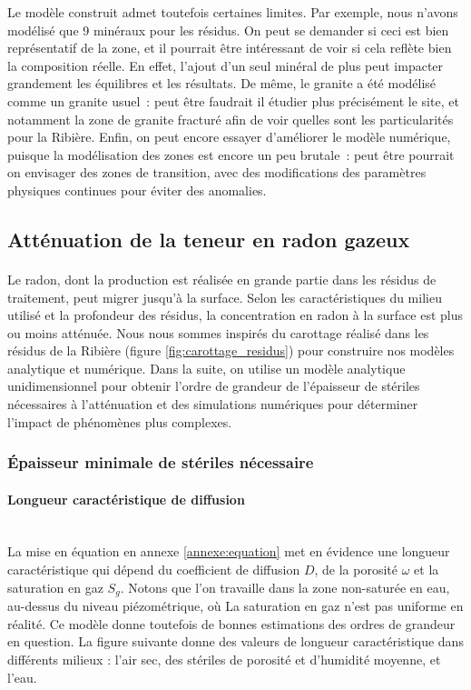 \documentclass{article}
\begin{document}
Le modèle construit admet toutefois certaines limites. Par exemple, nous n’avons modélisé que 9 minéraux pour les résidus. On peut se demander si ceci est bien représentatif de la zone, et il pourrait être intéressant de voir si cela reflète bien la composition réelle. En effet, l’ajout d’un seul minéral de plus peut impacter grandement les équilibres et les résultats. De même, le granite a été modélisé comme un granite usuel~: peut être faudrait il étudier plus précisément le site, et notamment la zone de granite fracturé afin de voir quelles sont les particularités pour la Ribière. Enfin, on peut encore essayer d’améliorer le modèle numérique, puisque la modélisation des zones est encore un peu brutale~: peut être pourrait on envisager des zones de transition, avec des modifications des paramètres physiques continues pour éviter des anomalies.

\subsection{Atténuation de la teneur en radon gazeux}

\paragraph{} Le radon, dont la production est réalisée en grande partie dans les résidus de traitement, peut migrer jusqu’à la surface. Selon les caractéristiques du milieu utilisé et la profondeur des résidus, la concentration en radon à la surface est plus ou moins atténuée. Nous nous sommes inspirés du carottage réalisé dans les résidus de la Ribière (figure \ref{fig:carottage_residus}) pour construire nos modèles analytique et numérique. Dans la suite, on utilise un modèle analytique unidimensionnel pour obtenir l'ordre de grandeur de l'épaisseur de stériles nécessaires à l'atténuation et des simulations numériques pour déterminer l'impact de phénomènes plus complexes.

\subsubsection{Épaisseur minimale de stériles nécessaire}

\paragraph{Longueur caractéristique de diffusion \\ \\} La mise en équation en annexe \ref{annexe:equation} met en évidence une longueur caractéristique qui dépend du coefficient de diffusion $D$, de la porosité $\omega$ et la saturation en gaz $S_g$. Notons que l’on travaille dans la zone non-saturée en eau, au-dessus du niveau piézométrique, où La saturation en gaz n’est pas uniforme en réalité. Ce modèle donne toutefois de bonnes estimations des ordres de grandeur en question. La figure suivante donne des valeurs de longueur caractéristique dans différents milieux : l'air sec, des stériles de porosité et d'humidité moyenne, et l'eau.
\end{document}
